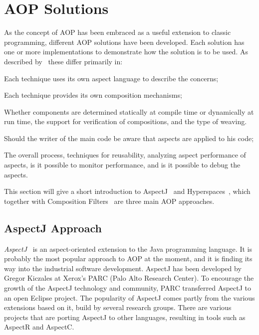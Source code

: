 \section{AOP Solutions}
\label{sec:AOPSolutions}

As the concept of AOP has been embraced as a useful extension to classic programming, different AOP solutions have been developed.
Each solution has one or more implementations to demonstrate how the solution is to be used. 
As described by~\cite{elrad:cacm01} these differ primarily in:
\begin{description}[style=nextline,noitemsep]
  \item[How aspects are specified] Each technique uses its own aspect language to describe the concerns;
  \item[Composition mechanism] Each technique provides its own composition mechanisms;
  \item[Implementation mechanism] Whether components are determined statically at compile time or dynamically at run time, the support for verification of compositions, and the type of weaving.
  \item[Use of decoupling] Should the writer of the main code be aware that aspects are applied to his code;
  \item[Supported software processes] The overall process, techniques for reusability, analyzing aspect performance of aspects, is it possible to monitor performance, and is it possible to debug the aspects.
\end{description}

This section will give a short introduction to AspectJ~\cite{kiczales:ecoop01} and Hyperspaces~\cite{ossher:sact01}, which together with Composition Filters~\cite{bergmans:cacm01} are three main AOP approaches.

\subsection{AspectJ Approach}
\label{sec:TheAspectJApproach}

\emph{AspectJ}~\cite{kiczales:ecoop01} is an aspect-oriented extension to the Java programming language.
It is probably the most popular approach to AOP at the moment, and it is finding its way into the industrial software development.
AspectJ has been developed by Gregor Kiczales at Xerox's PARC (Palo Alto Research Center).
To encourage the growth of the AspectJ technology and community, PARC transferred AspectJ to an open Eclipse project.
The popularity of AspectJ comes partly from the various extensions based on it, build by several research groups.
There are various projects that are porting AspectJ to other languages, resulting in tools such as AspectR and AspectC.

